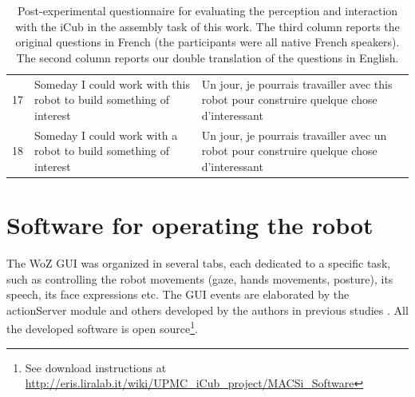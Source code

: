 \documentclass[twocolumn]{svjour3}          %
\begin{document}
\begin{table}
\begin{tabular}{|c|p{7.5cm}|p{7.5cm}|}
17 & Someday I could work with this robot to build something of interest& Un jour, je pourrais travailler avec this robot pour construire quelque chose d'interessant\\
18&  Someday I could work with a robot to build something of interest& Un jour, je pourrais travailler avec un robot pour construire quelque chose d'interessant\\
\hline
\end{tabular}
\caption{Post-experimental questionnaire for evaluating the perception and interaction with the iCub in the assembly task of this work. The third column reports the original questions in French (the participants were all native French speakers). The second column reports our double translation of the questions in English.}
\label{table:postexperimentquestionnaire}
\end{table}


\section{Software for operating the robot}\label{appendix:GUI}

The WoZ GUI was organized in several tabs, each dedicated to a specific task, such as controlling the robot movements (gaze, hands movements, posture), its speech, its face expressions etc.
The GUI events are elaborated by the actionServer module and others developed by the authors in previous studies \cite{ivaldi2014frontiers,Ivaldi2014tamd}. All the developed software is open source\footnote{See download instructions at \url{http://eris.liralab.it/wiki/UPMC_iCub_project/MACSi_Software}}.
\end{document}
